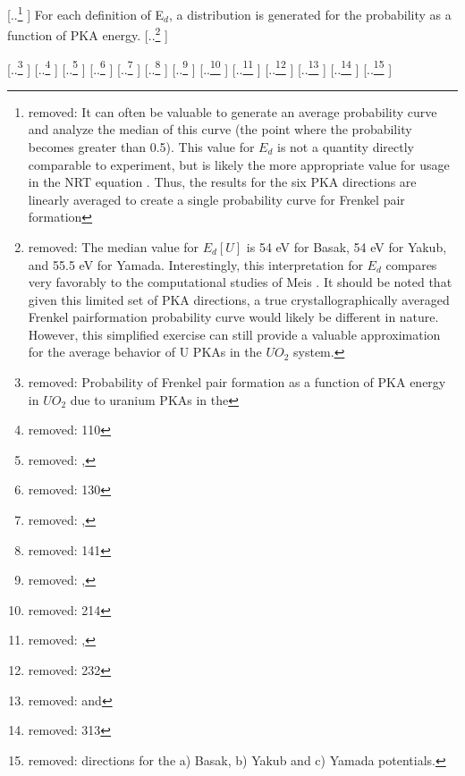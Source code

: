 \documentclass[review]{elsarticle} %
\providecommand{\DIFaddtex}[1]{{\protect\color{blue} \sf #1}} %
\providecommand{\DIFdeltex}[1]{{\protect\color{red} [..\footnote{removed: #1} ]}} %
\providecommand{\DIFaddbegin}{} %
\providecommand{\DIFaddend}{} %
\providecommand{\DIFdelbegin}{} %
\providecommand{\DIFdelend}{} %
\providecommand{\DIFdelFL}[1]{\DIFdel{#1}} %
\providecommand{\DIFadd}[1]{\texorpdfstring{\DIFaddtex{#1}}{#1}} %
\providecommand{\DIFdel}[1]{\texorpdfstring{\DIFdeltex{#1}}{}} %
\newcommand{\DIFscaledelfig}{0.5}
\newlength{\DIFdelgraphicswidth} %
\newlength{\DIFdelgraphicsheight} %
\newcommand{\DIFaddincludegraphics}[2][]{{\color{blue}\fbox{\DIFOincludegraphics[#1]{#2}}}} %
\newcommand{\DIFdelincludegraphics}[2][]{%
\sbox{\DIFdelgraphicsbox}{\DIFOincludegraphics[#1]{#2}}%
\settoboxwidth{\DIFdelgraphicswidth}{\DIFdelgraphicsbox} %
\settoboxtotalheight{\DIFdelgraphicsheight}{\DIFdelgraphicsbox} %
\scalebox{\DIFscaledelfig}{%
\parbox[b]{\DIFdelgraphicswidth}{\usebox{\DIFdelgraphicsbox}\\[-\baselineskip] \rule{\DIFdelgraphicswidth}{0em}}\llap{\resizebox{\DIFdelgraphicswidth}{\DIFdelgraphicsheight}{%
\setlength{\unitlength}{\DIFdelgraphicswidth}%
\begin{picture}(1,1)%
\thicklines\linethickness{2pt} %
{\color[rgb]{1,0,0}\put(0,0){\framebox(1,1){}}}%
{\color[rgb]{1,0,0}\put(0,0){\line( 1,1){1}}}%
{\color[rgb]{1,0,0}\put(0,1){\line(1,-1){1}}}%
\end{picture}%
}\hspace*{3pt}}} %
} %
\DeclareRobustCommand{\DIFaddbegin}{\DIFOaddbegin \let\includegraphics\DIFaddincludegraphics} %
\DeclareRobustCommand{\DIFaddend}{\DIFOaddend \let\includegraphics\DIFOincludegraphics} %
\DeclareRobustCommand{\DIFdelbegin}{\DIFOdelbegin \let\includegraphics\DIFdelincludegraphics} %
\DeclareRobustCommand{\DIFdelend}{\DIFOaddend \let\includegraphics\DIFOincludegraphics} %
\begin{document}
\DIFdel{It can often be valuable to generate an average probability curve and analyze the median of this curve (the point where the probability becomes greater than 0.5). This value for $E_{d}$ is not a quantity directly comparable to experiment, but is likely the more appropriate value for usage in the NRT equation \cite{nordlund2006, beelertde}. Thus, the results for the six PKA directions are linearly averaged to create a single probability curve for Frenkel pair formation }\DIFdelend \DIFaddbegin \DIFadd{For each definition of E$_d$, a distribution is generated for the probability }\DIFaddend as a function of PKA energy. \DIFdelbegin \DIFdel{The median value for $E_d [U]$ is 54 eV for Basak, 54 eV for Yakub, and 55.5 eV for Yamada. Interestingly, this interpretation for $E_{d}$ compares very favorably to the computational studies of Meis \cite{meis2005}. It should be noted that given this limited set of PKA directions, a true crystallographically averaged Frenkel pairformation probability curve would likely be different in nature. However, this simplified exercise can still provide a valuable approximation for the average behavior of U PKAs in the $UO_{2}$ system.
}%

{%
\DIFdelFL{Probability of Frenkel pair formation as a function of PKA energy in $UO_2$ due to uranium PKAs in the }%
\DIFdelFL{110}%
\DIFdelFL{, }%
\DIFdelFL{130}%
\DIFdelFL{, }%
\DIFdelFL{141}%
\DIFdelFL{, }%
\DIFdelFL{214}%
\DIFdelFL{, }%
\DIFdelFL{232}%
\DIFdelFL{and }%
\DIFdelFL{313}%
\DIFdelFL{directions for the a) Basak, b) Yakub and c) Yamada potentials.  }}
\end{document}
